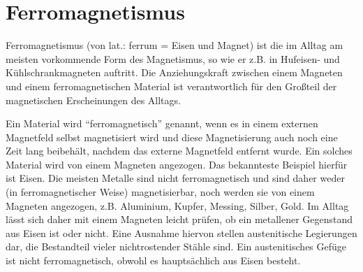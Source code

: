 \chapter{Ferromagnetismus}
Ferromagnetismus (von lat.: ferrum = Eisen und Magnet) ist die im Alltag am meisten vorkommende Form des Magnetismus, so wie er z.B. in Hufeisen- und Kühlschrankmagneten auftritt. Die Anziehungskraft zwischen einem Magneten und einem ferromagnetischen Material ist verantwortlich für den Großteil der magnetischen Erscheinungen des Alltags.

Ein Material wird "`ferromagnetisch"'  genannt, wenn es in einem externen Magnetfeld selbst magnetisiert wird und diese Magnetisierung auch noch eine Zeit lang beibehält, nachdem das externe Magnetfeld entfernt wurde. Ein solches Material wird von einem Magneten angezogen. Das bekannteste Beispiel hierfür ist Eisen. Die meisten Metalle sind nicht ferromagnetisch und sind daher weder (in ferromagnetischer Weise) magnetisierbar, noch werden sie von einem Magneten angezogen, z.B. Aluminium, Kupfer, Messing, Silber, Gold. Im Alltag lässt sich daher mit einem Magneten leicht prüfen, ob ein metallener Gegenstand aus Eisen ist oder nicht. Eine Ausnahme hiervon stellen austenitische Legierungen dar, die Bestandteil vieler nichtrostender Stähle sind. Ein austenitisches Gefüge ist nicht ferromagnetisch, obwohl es hauptsächlich aus Eisen besteht.
\newline
